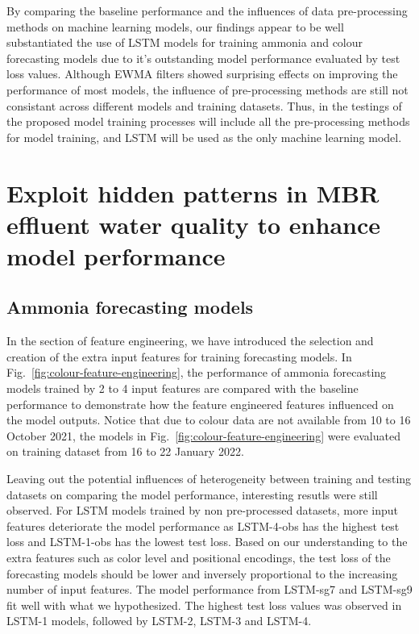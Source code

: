 By comparing the baseline performance and the influences of data pre-processing methods on machine learning models, our findings appear to be well substantiated the use of LSTM models for training ammonia and colour forecasting models due to it's outstanding model performance evaluated by test loss values. Although EWMA filters showed surprising effects on improving the performance of most models, the influence of pre-processing methods are still not consistant across different models and training datasets. Thus, in the testings of the proposed model training processes will include all the pre-processing methods for model training, and LSTM will be used as the only machine learning model.

\section{Exploit hidden patterns in MBR effluent water quality to enhance model performance}
\subsection{Ammonia forecasting models}
In the section of feature engineering, we have introduced the selection and creation of the extra input features for training forecasting models. In Fig.~\ref{fig:colour-feature-engineering}, the performance of ammonia forecasting models trained by 2 to 4 input features are compared with the baseline performance to demonstrate how the feature engineered features influenced on the model outputs. Notice that due to colour data are not available from 10 to 16 October 2021, the models in Fig.~\ref{fig:colour-feature-engineering} were evaluated on training dataset from 16 to 22 January 2022. 

Leaving out the potential influences of heterogeneity between training and testing datasets on comparing the model performance, interesting resutls were still observed. For LSTM models trained by non pre-processed datasets, more input features deteriorate the model performance as LSTM-4-obs has the highest test loss and LSTM-1-obs has the lowest test loss. Based on our understanding to the extra features such as color level and positional encodings, the test loss of the forecasting models should be lower and inversely proportional to the increasing number of input features. The model performance from LSTM-sg7 and LSTM-sg9 fit well with what we hypothesized. The highest test loss values was observed in LSTM-1 models, followed by LSTM-2, LSTM-3 and LSTM-4. 

